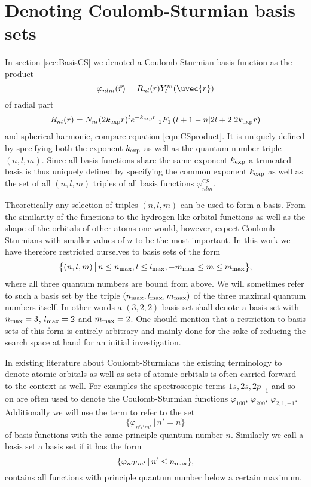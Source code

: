 \section{Denoting Coulomb-Sturmian basis sets}
In section \vref{sec:BasisCS}
we denoted a Coulomb-Sturmian basis function as the product
\begin{equation}
	\varphi_{nlm}(\vec{r}) = R_{nl}(r) Y_l^m(\uvec{r})
\end{equation}
of radial part
\begin{equation}
	\label{eqn:RadialPartCsRepeated}
	R_{nl}(r) = N_{nl} (2k_\text{exp} r)^l e^{-k_\text{exp} r}
	\;_1F_1\left(l+1-n \middle| 2l+2 \middle|2k_\text{exp} r\right)
\end{equation}
and spherical harmonic, compare equation \eqref{eqn:CSproduct}.
It is uniquely defined by specifying both the \CS exponent $k_\text{exp}$
as well as the quantum number triple $(n,l,m)$.
Since all basis functions share the same exponent $k_\text{exp}$
a truncated \CS basis is thus uniquely defined by specifying
the common exponent $k_\text{exp}$ as well as the set of all $(n, l, m)$
triples of all basis functions $\varphi^\text{CS}_{nlm}$.

Theoretically any selection of triples $(n, l, m)$ can be used to form a \CS basis.
From the similarity of the \CS functions to the hydrogen-like orbital functions
as well as the shape of the orbitals of other atoms
one would, however, expect Coulomb-Sturmians with smaller values of $n$
to be the most important.
In this work we have therefore restricted ourselves to \CS basis sets
of the form
\[ \big\{ (n, l, m) \, \big| \, n \le n_\text{max}, l \le l_\text{max}, -m_\text{max} \le m \le m_\text{max} \big\}, \]
\ie where all three quantum numbers are bound from above.
We will sometimes refer to such a \CS basis set by the triple
$(n_\text{max}, l_\text{max}, m_\text{max})$ of the three maximal quantum numbers itself.
In other words a $(3,2,2)$-basis set shall denote a basis set with
$n_\text{max} = 3$, $l_\text{max} = 2$ and $m_\text{max} = 2$.
One should mention that a restriction to basis sets of this form
is entirely arbitrary
and mainly done for the sake of reducing the search space at hand
for an initial investigation.

In existing literature about Coulomb-Sturmians the existing terminology
to denote atomic orbitals as well as sets of atomic orbitals is often carried
forward to the \CS context as well.
For examples the spectroscopic terms $1s, 2s, 2p_{-1}$ and so on
are often used to denote the Coulomb-Sturmian functions
$\varphi_{100}$, $\varphi_{200}$, $\varphi_{2,1,-1}$.
Additionally we will use the term  to refer to the set
\[ \{ \varphi_{n'l'm'} \, | \, n' = n \} \]
of \CS basis functions with the same principle quantum number $n$.
Similarly we call a \CS basis set a  basis set
if it has the form
\[ \{ \varphi_{n'l'm'} \, | \, n' \leq n_\text{max} \}, \]
\ie contains all \CS functions with principle quantum number
below a certain maximum.
